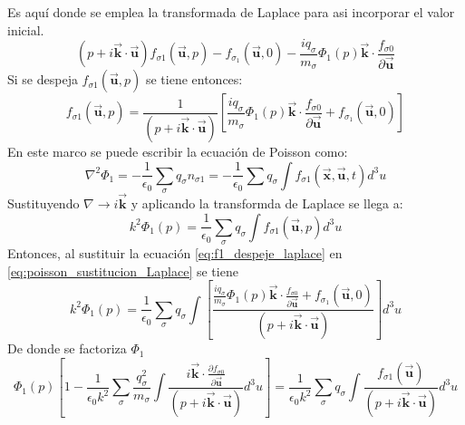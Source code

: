 \documentclass[../tesis_main_file.tex]{subfiles}
\begin{document}
Es aquí donde se emplea la transformada de Laplace para asi incorporar el valor inicial.
\begin{equation}
(p + i\overrightarrow{\textbf{k}}\cdot \overrightarrow{\textbf{u}})f_{\sigma 1}(\overrightarrow{\textbf{u}},p)- f_{\sigma _1}(\overrightarrow{\textbf{u}},0)-\frac{i q_{\sigma}}{m_{\sigma}}\Phi _1(p)\overrightarrow{\textbf{k}}\cdot \frac{f_{\sigma 0}}{\partial \overrightarrow{\textbf{u}}}
\end{equation}
Si se despeja $f_{\sigma 1}(\overrightarrow{\textbf{u}},p)$ se tiene entonces:
\begin{equation}
\label{eq:f1_despeje_laplace}
f_{\sigma 1}(\overrightarrow{\textbf{u}},p)=\frac{1}{(p + i\overrightarrow{\textbf{k}}\cdot \overrightarrow{\textbf{u}})}\left[\frac{i q_{\sigma}}{m_{\sigma}}\Phi _1(p)\overrightarrow{\textbf{k}}\cdot \frac{f_{\sigma 0}}{\partial \overrightarrow{\textbf{u}}} + f_{\sigma _1}(\overrightarrow{\textbf{u}},0)\right]
\end{equation}
En este marco se puede escribir la ecuación de Poisson como:
\begin{equation}
\nabla ^2 \Phi _1 =- \frac{1}{\epsilon_0}\sum_{\sigma} q_{\sigma}n_{\sigma 1}= - \frac{1}{\epsilon_0}\sum q_{\sigma} \int f_{\sigma 1}(\overrightarrow{\textbf{x}},\overrightarrow{\textbf{u}},t)d^3u
\end{equation}
Sustituyendo $\nabla \rightarrow i \overrightarrow{\textbf{k}}$ y aplicando la transformda de Laplace se llega a:
\begin{equation}
\label{eq:poisson_sustitucion_Laplace}
k^2 \Phi _1(p)=\frac{1}{\epsilon_0} \sum_{\sigma} q_{\sigma}\int f_{\sigma 1}(\overrightarrow{\textbf{u}},p)d^3u
\end{equation}
Entonces, al sustituir la ecuación \ref{eq:f1_despeje_laplace} en \ref{eq:poisson_sustitucion_Laplace} se tiene
\begin{equation}
k^2 \Phi _1(p)=\frac{1}{\epsilon_0}\sum_{\sigma}q_{\sigma}\int \left[\frac{\frac{i q_{\sigma}}{m_{\sigma}}\Phi _1(p)\overrightarrow{\textbf{k}}\cdot \frac{f_{\sigma 0}}{\partial \overrightarrow{\textbf{u}}} + f_{\sigma _1}(\overrightarrow{\textbf{u}},0)}{(p + i\overrightarrow{\textbf{k}}\cdot \overrightarrow{\textbf{u}})}\right]d^3u
\end{equation}
De donde se factoriza $\Phi_1$ 
\begin{equation}
\Phi _1 (p)\left[1-\frac{1}{\epsilon_0 k^2}\sum_{\sigma}\frac{q_{\sigma}^2}{m_{\sigma}}\int  \frac{i\overrightarrow{\textbf{k}}\cdot \frac{\partial f_{\sigma 0}}{\partial \overrightarrow{\textbf{u}}}}{(p + i\overrightarrow{\textbf{k}}\cdot \overrightarrow{\textbf{u}})}d^3u \right]=\frac{1}{\epsilon_0 k^2}\sum_{\sigma}q_{\sigma}\int \frac{f_{\sigma 1}(\overrightarrow{\textbf{u}})}{(p + i\overrightarrow{\textbf{k}}\cdot \overrightarrow{\textbf{u}})}d^3u
\end{equation}
\end{document}
